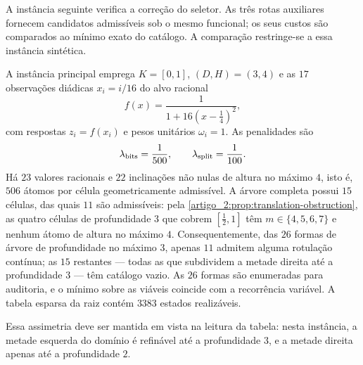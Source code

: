 \documentclass[12pt,a4paper]{article}
\theoremstyle{preciso}
\theoremstyle{definition}
\theoremstyle{preciso}
\theoremstyle{preciso}
\theoremstyle{preciso}
\theoremstyle{preciso}
\theoremstyle{definition}
\theoremstyle{preciso}
\theoremstyle{definition}
\theoremstyle{preciso}
\theoremstyle{preciso}
\theoremstyle{definition}
\begin{document}
A instância seguinte verifica a correção do seletor. As três rotas auxiliares fornecem candidatos admissíveis sob o mesmo funcional; os seus custos são comparados ao mínimo exato do catálogo. A comparação restringe-se a essa instância sintética.

A instância principal emprega $K=[0,1]$, $(D,H)=(3,4)$ e as $17$ observações
diádicas $x_i=i/16$ do alvo racional
\begin{equation}
 f(x)=\frac{1}{1+16(x-\tfrac14)^2},
 \label{artigo_2:eq:experiment-target}
\end{equation}
com respostas $z_i=f(x_i)$ e pesos unitários $\omega_i=1$. As penalidades são
\[
 \lambda_{\rm bits}=\frac1{500},
 \qquad
 \lambda_{\rm split}=\frac1{100}.
\]
Há $23$ valores racionais e $22$ inclinações não nulas de altura no máximo
$4$, isto é, $506$ átomos por célula geometricamente admissível. A árvore
completa possui $15$ células, das quais $11$ são admissíveis: pela
\cref{artigo_2:prop:translation-obstruction}, as quatro células de profundidade $3$ que
cobrem $[\tfrac12,1]$ têm $m\in\{4,5,6,7\}$ e nenhum átomo de altura no
máximo $4$. Consequentemente, das $26$ formas de árvore de profundidade no
máximo $3$, apenas $11$ admitem alguma rotulação contínua; as $15$ restantes
--- todas as que subdividem a metade direita até a profundidade $3$ --- têm
catálogo vazio. As $26$ formas são enumeradas para auditoria, e o mínimo sobre
as viáveis coincide com a recorrência variável. A tabela esparsa da raiz
contém $3383$ estados realizáveis.

Essa assimetria deve ser mantida em vista na leitura da tabela: nesta instância, a
metade esquerda do domínio é refinável até a profundidade $3$, e a metade
direita apenas até a profundidade $2$.
\end{document}
